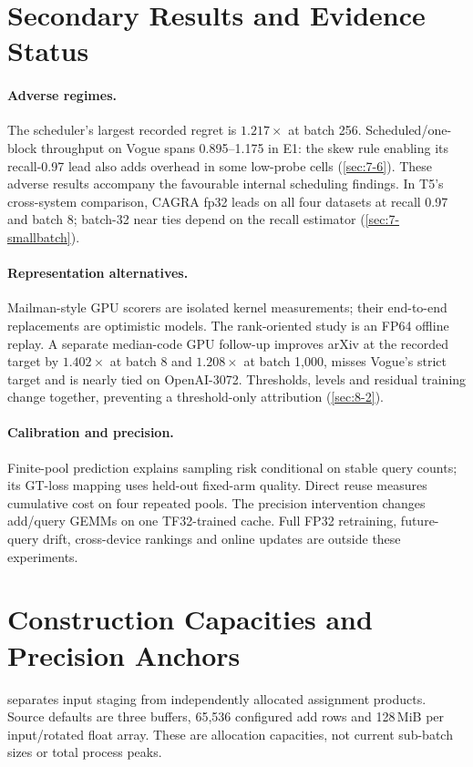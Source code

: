 \section{Secondary Results and Evidence Status}
\label{sec:b-secondary}
\paragraph{Adverse regimes.}
The scheduler's largest recorded regret is $1.217\times$ at batch 256.
Scheduled/one-block throughput on Vogue spans 0.895--1.175 in E1:
the skew rule enabling its recall-0.97 lead also adds overhead in some
low-probe cells (\cref{sec:7-6}). These adverse results accompany the
favourable internal scheduling findings. In T5's cross-system comparison,
CAGRA fp32 leads on all four datasets at recall 0.97 and batch 8;
batch-32 near ties depend on the recall estimator
(\cref{sec:7-smallbatch}).

\paragraph{Representation alternatives.}
Mailman-style GPU scorers are isolated kernel measurements; their
end-to-end replacements are optimistic models. The rank-oriented study
is an FP64 offline replay. A separate median-code GPU follow-up improves
arXiv at the recorded target by $1.402\times$ at batch 8 and
$1.208\times$ at batch 1,000, misses Vogue's strict target and is nearly
tied on OpenAI-3072. Thresholds, levels and residual training change
together, preventing a threshold-only attribution (\cref{sec:8-2}).

\paragraph{Calibration and precision.}
Finite-pool prediction explains sampling risk conditional on stable
query counts; its GT-loss mapping uses held-out fixed-arm quality.
Direct reuse measures cumulative cost on four repeated pools.
The precision intervention changes add/query GEMMs on one TF32-trained
cache. Full FP32 retraining, future-query drift, cross-device rankings
and online updates are outside these experiments.

\section{Construction Capacities and Precision Anchors}
\label{sec:b-full-review}

 separates input staging from independently allocated
assignment products. Source defaults are three buffers, 65,536 configured
add rows and 128\,MiB per input/rotated float array. These are allocation
capacities, not current sub-batch sizes or total process peaks.

